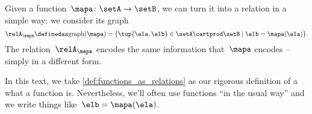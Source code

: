 Given a function~$\mapa \colon \setA \to \setB$, we can turn it into a relation in a simple way: we consider its graph
\begin{equation*}
    \relA_\mapa \definedas \text{graph}(\mapa) = \{ \tup{\ela,\elb} \in \setA \cartprod \setB \mid \elb= \mapa(\ela) \}.
\end{equation*}
The relation~$\relA_\mapa$ encodes the same information that~$\mapa$ encodes -- simply in a different form.

In this text, we take \cref{def:functions_as_relations} as our rigorous definition of a what a function is.
Nevertheless, we'll often use functions ``in the usual way'' and we write things like~$\elb = \mapa(\ela)$.






